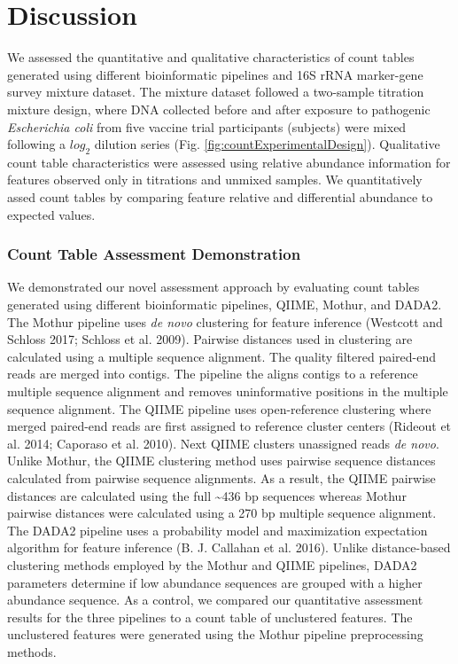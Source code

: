 \documentclass[smallextended]{svjour3}       %
\begin{document}
\hypertarget{discussion}{%
\section{Discussion}\label{discussion}}

We assessed the quantitative and qualitative characteristics of count
tables generated using different bioinformatic pipelines and 16S rRNA
marker-gene survey mixture dataset. The mixture dataset followed a
two-sample titration mixture design, where DNA collected before and
after exposure to pathogenic \emph{Escherichia coli} from five vaccine
trial participants (subjects) were mixed following a \(log_2\) dilution
series (Fig. \ref{fig:countExperimentalDesign}). Qualitative count table
characteristics were assessed using relative abundance information for
features observed only in titrations and unmixed samples. We
quantitatively assed count tables by comparing feature relative and
differential abundance to expected values.

\hypertarget{count-table-assessment-demonstration}{%
\subsubsection{Count Table Assessment
Demonstration}\label{count-table-assessment-demonstration}}

We demonstrated our novel assessment approach by evaluating count tables
generated using different bioinformatic pipelines, QIIME, Mothur, and
DADA2. The Mothur pipeline uses \emph{de novo} clustering for feature
inference (Westcott and Schloss 2017; Schloss et al. 2009). Pairwise
distances used in clustering are calculated using a multiple sequence
alignment. The quality filtered paired-end reads are merged into
contigs. The pipeline the aligns contigs to a reference multiple
sequence alignment and removes uninformative positions in the multiple
sequence alignment. The QIIME pipeline uses open-reference clustering
where merged paired-end reads are first assigned to reference cluster
centers (Rideout et al. 2014; Caporaso et al. 2010). Next QIIME clusters
unassigned reads \emph{de novo}. Unlike Mothur, the QIIME clustering
method uses pairwise sequence distances calculated from pairwise
sequence alignments. As a result, the QIIME pairwise distances are
calculated using the full \textasciitilde{}436 bp sequences whereas
Mothur pairwise distances were calculated using a 270 bp multiple
sequence alignment. The DADA2 pipeline uses a probability model and
maximization expectation algorithm for feature inference (B. J. Callahan
et al. 2016). Unlike distance-based clustering methods employed by the
Mothur and QIIME pipelines, DADA2 parameters determine if low abundance
sequences are grouped with a higher abundance sequence. As a control, we
compared our quantitative assessment results for the three pipelines to
a count table of unclustered features. The unclustered features were
generated using the Mothur pipeline preprocessing methods.
\end{document}
